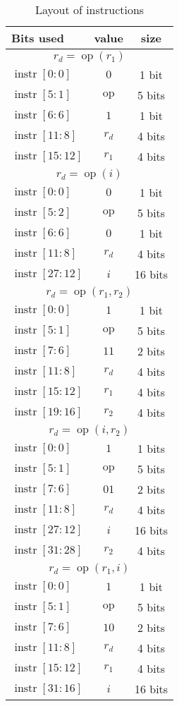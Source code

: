 \documentclass{scrartcl}
\DeclareMathOperator{\op}{op}
\DeclareMathOperator{\instr}{instr}
\begin{document}
\begin{table}
  \center
  \label{tab:instrs}
  \caption{Layout of instructions}
  \begin{tabular}{lcc}
    \toprule
    \textbf{Bits used} & \textbf{value} & \textbf{size}\\
    \midrule
    \multicolumn{3}{c}{\(r_d = \op(r_1)\)}\\
    \(\instr[0:0]\) & \(0\) & 1 bit\\
    \(\instr[5:1]\) & \(\op\) & 5 bits\\
    \(\instr[6:6]\) & \(1\) & 1 bit\\
    \(\instr[11:8]\) & \(r_d\) & 4 bits\\
    \(\instr[15:12]\) & \(r_1\) & 4 bits\\
    \midrule
    \multicolumn{3}{c}{\(r_d = \op(i)\)}\\
    \(\instr[0:0]\) & \(0\) & 1 bit\\
    \(\instr[5:2]\) & \(\op\) & 5 bits\\
    \(\instr[6:6]\) & \(0\) & 1 bit\\
    \(\instr[11:8]\) & \(r_d\) & 4 bits\\
    \(\instr[27:12]\) & \(i\) & 16 bits\\
    \midrule
    \multicolumn{3}{c}{\(r_d = \op(r_1, r_2)\)}\\
    \(\instr[0:0]\) & \(1\) & 1 bit\\
    \(\instr[5:1]\) & \(\op\) & 5 bits\\
    \(\instr[7:6]\) & \(11\) & 2 bits\\
    \(\instr[11:8]\) & \(r_d\) & 4 bits\\
    \(\instr[15:12]\) & \(r_1\) & 4 bits\\
    \(\instr[19:16]\) & \(r_2\) & 4 bits\\
    \midrule
    \multicolumn{3}{c}{\(r_d = \op(i, r_2)\)}\\
    \(\instr[0:0]\) & \(1\) & 1 bits\\
    \(\instr[5:1]\) & \(\op\) & 5 bits\\
    \(\instr[7:6]\) & \(01\) & 2 bits\\
    \(\instr[11:8]\) & \(r_d\) & 4 bits\\
    \(\instr[27:12]\) & \(i\) & 16 bits\\
    \(\instr[31:28]\) & \(r_2\) & 4 bits\\
    \midrule
    \multicolumn{3}{c}{\(r_d = \op(r_1, i)\)}\\
    \(\instr[0:0]\) & \(1\) & 1 bit\\
    \(\instr[5:1]\) & \(\op\) & 5 bits\\
    \(\instr[7:6]\) & \(10\) & 2 bits\\
    \(\instr[11:8]\) & \(r_d\) & 4 bits\\
    \(\instr[15:12]\) & \(r_1\) & 4 bits\\
    \(\instr[31:16]\) & \(i\) & 16 bits\\
    \bottomrule
  \end{tabular}
\end{table}
\end{document}

